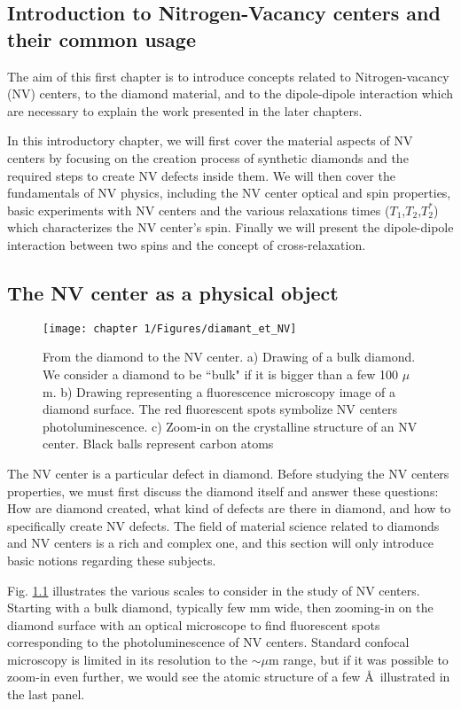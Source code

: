 \documentclass[a4paper,11pt]{report}
\title{}
\begin{document}
\begin{refsection}

\chapter{Introduction to Nitrogen-Vacancy centers and their common usage}
The aim of this first chapter is to introduce concepts related to Nitrogen-vacancy (NV) centers, to the diamond material, and to the dipole-dipole interaction which are necessary to explain the work presented in the later chapters.

In this introductory chapter, we will first cover the material aspects of NV centers by focusing on the creation process of synthetic diamonds and the required steps to create NV defects inside them. We will then cover the fundamentals of NV physics, including the NV center optical and spin properties, basic experiments with NV centers and the various relaxations times ($T_1$,$T_2$,$T_2^*$) which characterizes the NV center's spin. Finally we will present the dipole-dipole interaction between two spins and the concept of cross-relaxation.

\section{The NV center as a physical object}
\begin{figure}[h!]
\centering
\texttt{[image: chapter 1/Figures/diamant\_et\_NV]}
\caption{From the diamond to the NV center. a) Drawing of a bulk diamond. We consider a diamond to be ``bulk" if it is bigger than a few 100 $\mu$m. b) Drawing representing a fluorescence microscopy image of a diamond surface. The red fluorescent spots symbolize NV centers photoluminescence. c) Zoom-in on the crystalline structure of an NV center. Black balls represent carbon atoms}
\label{diamond+NV}
\end{figure}
The NV center is a particular defect in diamond. Before studying the NV centers properties, we must first discuss the diamond itself and answer these questions: How are diamond created, what kind of defects are there in diamond, and how to specifically create NV defects. The field of material science related to diamonds and NV centers is a rich and complex one, and this section will only introduce basic notions regarding these subjects.

Fig. \ref{diamond+NV} illustrates the various scales to consider in the study of NV centers. Starting with a bulk diamond, typically few mm wide, then zooming-in on the diamond surface with an optical microscope to find fluorescent spots corresponding to the photoluminescence of NV centers. Standard confocal microscopy is limited in its resolution to the $\sim \mu$m range, but if it was possible to zoom-in even further, we would see the atomic structure of a few \AA \ illustrated in the last panel. 

\end{refsection}
\end{document}
